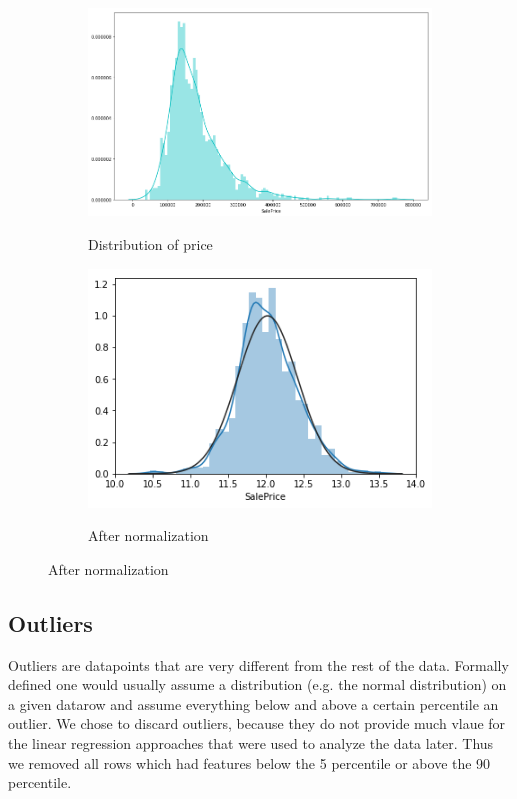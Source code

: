 \begin{figure}[h!]
  \centering
  \begin{subfigure}[b]{0.4\linewidth}
    \includegraphics[width=\linewidth]{images/price_distribution.png}
    \label{fig:dist-1}
    \caption{Distribution of price}
  \end{subfigure}
  \begin{subfigure}[b]{0.4\linewidth}
    \includegraphics[width=\linewidth]{images/price_normalize_distribution.png}
    \label{fig:dist-2}
    \caption{After normalization}
  \end{subfigure}
\end{figure}

\subsection{Outliers}
Outliers are datapoints that are very different from the rest of the data. Formally defined one would usually assume a distribution (e.g. the normal distribution) on a given datarow and assume everything below and above a certain percentile an outlier.
 We chose to discard outliers, because they do not provide much vlaue for the linear regression approaches that were used to analyze the data later. Thus we removed all rows which had features below the 5 percentile or above the 90 percentile.\newline
